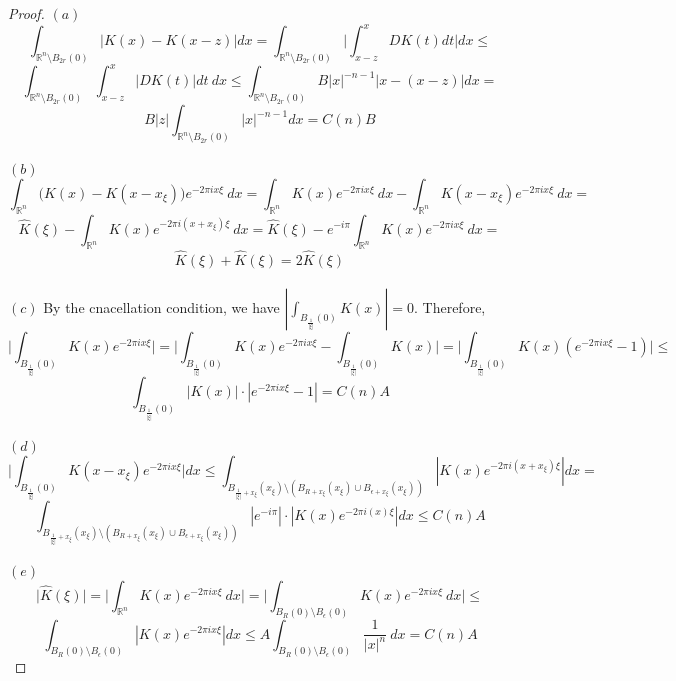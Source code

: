 \documentclass[12pt]{article}
\newenvironment{exercise}[2][Exercise]{\begin{trivlist}
\item[\hskip \labelsep {\bfseries #1}\hskip \labelsep {\bfseries #2.}]}{\end{trivlist}}
\begin{document}
\begin{proof}
  $(a)$
  $$\int_{\mathbb{R}^n \setminus B_{2r}(0)} |K(x) - K(x-z)| dx = \int_{\mathbb{R}^n \setminus B_{2r}(0)} \Big| \int_{x-z}^{x} DK(t) dt \Big| dx \le$$
  $$\int_{\mathbb{R}^n \setminus B_{2r}(0)} \int_{x-z}^{x} \Big|DK(t)\Big| dt\ dx \le \int_{\mathbb{R}^n \setminus B_{2r}(0)} B |x|^{-n-1} |x - (x-z)| dx =$$
  $$B |z| \int_{\mathbb{R}^n \setminus B_{2r}(0)} |x|^{-n-1}dx = C(n)B$$\\
  $(b)$
  $$\int_{\mathbb{R}^n} \Big( K(x) - K(x - x_{\xi}) \Big) e^{-2 \pi i x \xi}\ dx = \int_{\mathbb{R}^n} K(x) e^{-2 \pi i x \xi}\ dx - \int_{\mathbb{R}^n} K(x-x_\xi) e^{-2 \pi i x \xi}\ dx =$$
  $$\hat{K}(\xi) - \int_{\mathbb{R}^n} K(x) e^{-2 \pi i (x + x_\xi) \xi}\ dx = \hat{K}(\xi) - e^{-i \pi} \int_{\mathbb{R}^n} K(x) e^{-2 \pi i x \xi}\ dx =$$
  $$\hat{K}(\xi) + \hat{K}(\xi) = 2 \hat{K}(\xi)$$\\
  $(c)$ By  the cnacellation condition, we have $|\int_{B_{\frac{1}{|\xi|}}(0)} K(x)|=0$. Therefore,
  $$\Big| \int_{B_\frac{1}{|\xi|}(0)} K(x)e^{-2 \pi i x \xi} \Big| = \Big| \int_{B_\frac{1}{|\xi|}(0)} K(x)e^{-2 \pi i x \xi} - \int_{B_{\frac{1}{|\xi|}}(0)} K(x) \Big| = \Big| \int_{B_\frac{1}{|\xi|}(0)} K(x)(e^{-2 \pi i x \xi} - 1) \Big| \le$$
  $$\int_{B_\frac{1}{|\xi|}(0)} |K(x)|\cdot|e^{-2 \pi i x \xi} - 1| = C(n)A$$\\
  $(d)$
  $$\Big| \int_{B_\frac{1}{|\xi|}(0)} K(x-x_\xi)e^{-2 \pi i x \xi} \Big| dx \le \int_{B_{\frac{1}{|\xi|}+x_\xi}(x_\xi) \setminus  (B_{R+x_\xi}(x_\xi) \cup B_{\epsilon+x_\xi}(x_\xi))} |K(x)e^{-2 \pi i (x+x_\xi) \xi}| dx =$$ $$\int_{B_{\frac{1}{|\xi|}+x_\xi}(x_\xi) \setminus  (B_{R+x_\xi}(x_\xi) \cup B_{\epsilon+x_\xi}(x_\xi))} |e^{-i \pi}| \cdot |K(x)e^{-2 \pi i (x) \xi}| dx \le C(n) A$$\\
  $(e)$
  $$\Big| \hat{K}(\xi) \Big| = \Big| \int_{\mathbb{R}^n} K(x) e^{-2 \pi i x \xi}\ dx \Big| = \Big| \int_{B_R(0) \setminus B_\epsilon(0)} K(x) e^{-2 \pi i x \xi}\ dx \Big| \le$$
  $$\int_{B_R(0) \setminus B_\epsilon(0)} |K(x) e^{-2 \pi i x \xi}| dx \le A \int_{B_R(0) \setminus B_\epsilon(0)} \frac{1}{|x|^n}\ dx = C(n) A$$
\end{proof}

\begin{exercise}{3}
\end{exercise}
\end{document}
